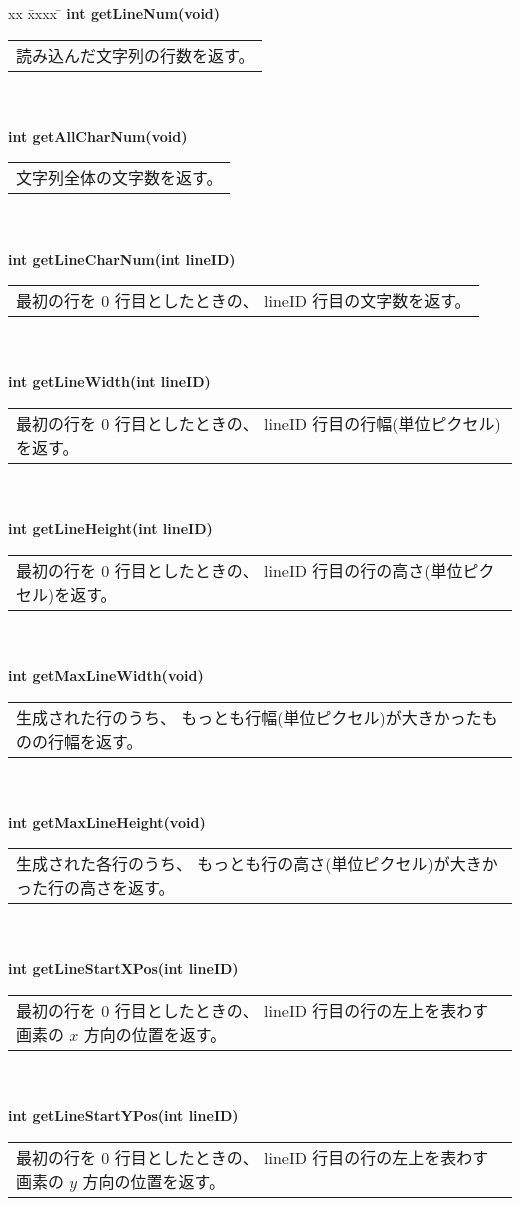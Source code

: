 \begin{tabbing}
xx \= xxxx \= \kill
\> \textbf{int getLineNum(void)} \\
	\> \> \begin{tabular}{p{15cm}}
		読み込んだ文字列の行数を返す。
	\end{tabular} \\ \\
\> \textbf{int getAllCharNum(void)} \\
	\> \> \begin{tabular}{p{15cm}}
		文字列全体の文字数を返す。
	\end{tabular} \\ \\
\> \textbf{int getLineCharNum(int lineID)} \\
	\> \> \begin{tabular}{p{15cm}}
		最初の行を 0 行目としたときの、
		lineID 行目の文字数を返す。
	\end{tabular} \\ \\
\> \textbf{int getLineWidth(int lineID)} \\
	\> \> \begin{tabular}{p{15cm}}
		最初の行を 0 行目としたときの、
		lineID 行目の行幅(単位ピクセル)を返す。
	\end{tabular} \\ \\
\> \textbf{int getLineHeight(int lineID)} \\
	\> \> \begin{tabular}{p{15cm}}
		最初の行を 0 行目としたときの、
		lineID 行目の行の高さ(単位ピクセル)を返す。
	\end{tabular} \\ \\
\> \textbf{int getMaxLineWidth(void)} \\
	\> \> \begin{tabular}{p{15cm}}
		生成された行のうち、
		もっとも行幅(単位ピクセル)が大きかったものの行幅を返す。
	\end{tabular} \\ \\
\> \textbf{int getMaxLineHeight(void)} \\
	\> \> \begin{tabular}{p{15cm}}
		生成された各行のうち、
		もっとも行の高さ(単位ピクセル)が大きかった行の高さを返す。
	\end{tabular} \\ \\
\> \textbf{int getLineStartXPos(int lineID)} \\
	\> \> \begin{tabular}{p{15cm}}
		最初の行を 0 行目としたときの、
		lineID 行目の行の左上を表わす画素の \(x\) 方向の位置を返す。
	\end{tabular} \\ \\
\> \textbf{int getLineStartYPos(int lineID)} \\
	\> \> \begin{tabular}{p{15cm}}
		最初の行を 0 行目としたときの、
		lineID 行目の行の左上を表わす画素の \(y\) 方向の位置を返す。
	\end{tabular}
\end{tabbing}

